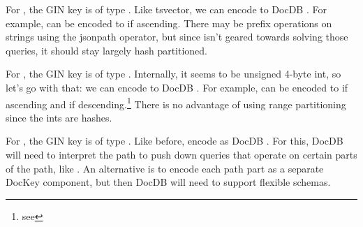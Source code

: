 For , the GIN key is of type .  Like
tsvector, we can encode to DocDB .  For example,
 can be encoded to  if
ascending.  There may be prefix operations on strings using the
 jsonpath operator, but since 
isn't geared towards solving those queries, it should stay largely hash
partitioned.

For , the GIN key is of type .
Internally, it seems to be unsigned 4-byte int, so let's go with that: we can
encode to DocDB .  For example,  can
be encoded to  if ascending and
 if descending.\footnote{see
}  There is no advantage of using range
partitioning since the ints are hashes.

For , the GIN key is of type .  Like
before, encode as DocDB .  For this, DocDB will need to
interpret the path to push down queries that operate on certain parts of the
path, like .  An alternative is to encode
each path part as a separate DocKey component, but then DocDB will need to
support flexible schemas.
